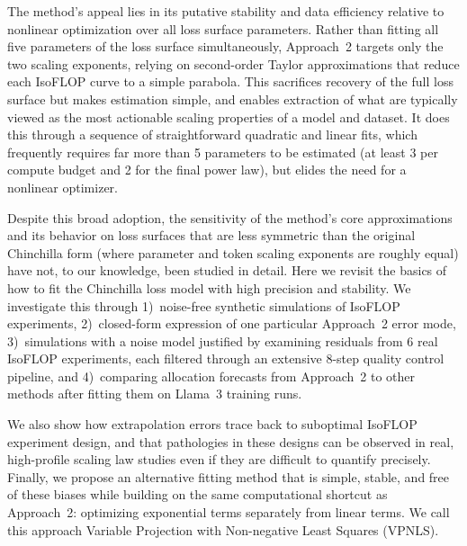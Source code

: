 \documentclass[11pt]{article}
\begin{document}
The method's appeal lies in its putative stability and data efficiency relative to
nonlinear optimization over all loss surface parameters. Rather than fitting
all five parameters of the loss surface simultaneously, Approach~2 targets only
the two scaling exponents, relying on second-order Taylor approximations that
reduce each IsoFLOP curve to a simple parabola. This sacrifices recovery
of the full loss surface but makes estimation simple, and enables extraction
of what are typically viewed as the most actionable scaling properties of a model and dataset. It does this
through a sequence of straightforward quadratic and linear fits, which frequently requires far more than 5 parameters
to be estimated (at least 3 per compute budget and 2 for the final power law), but elides the need for a nonlinear optimizer.

Despite this broad adoption, the sensitivity of the method's core
approximations and its behavior on loss surfaces that are less symmetric than
the original Chinchilla form (where parameter and token scaling exponents are
roughly equal) have not, to our knowledge, been studied in detail. Here we
revisit the basics of how to fit the Chinchilla loss model with high
precision and stability. We investigate this through
1)~noise-free synthetic simulations of IsoFLOP experiments,
2)~closed-form expression of one particular Approach~2 error mode,
3)~simulations with a noise model justified by examining
residuals from 6 real IsoFLOP experiments, each filtered through an extensive
8-step quality control pipeline, and
4)~comparing allocation forecasts from Approach~2 to other methods after
fitting them on Llama~3 training runs.

We also show how extrapolation errors trace back to suboptimal IsoFLOP
experiment design, and that pathologies in these designs can be observed in
real, high-profile scaling law studies even if they are difficult to quantify
precisely. Finally, we propose an alternative fitting method that is simple,
stable, and free of these biases while building on the same computational
shortcut as Approach~2: optimizing exponential terms separately from linear
terms. We call this approach Variable Projection with Non-negative Least
Squares (VPNLS).
\end{document}
